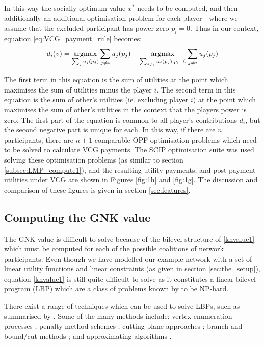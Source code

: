 In this way the socially optimum value $x^*$ needs to be computed, and then additionally an additional optimisation problem for each player - where we assume that the excluded participant has power zero $p_i=0$. Thus in our context, equation \ref{eq:VCG_payment_rule} becomes:
\begin{equation*} d_i(v)=\operatorname*{\arg\!\max}_{\sum_{j} u_j(p_j)}\sum_{j\ne i}u_j(p_j) - \operatorname*{\arg\!\max}_{\sum_{j\ne i} u_j(p_j), p_i=0}\sum_{j\ne i}u_j(p_j)\end{equation*}

The first term in this equation is the sum of utilities at the point which maximises the sum of utilities minus the player $i$.
The second term in this equation is the sum of other's utilities (ie. excluding player $i$) at the point which maximises the sum of other's utilities in the context that the players power is zero.
The first part of the equation is common to all player's contributions $d_i$, but the second negative part is unique for each.
In this way, if there are $n$ participants, there are $n+1$ comparable OPF optimisation problems which need to be solved to calculate VCG payments.
The SCIP optimisation suite was used solving these optimisation problems (as similar to section \ref{subsec:LMP_compute1}), and the resulting utility payments, and post-payment utilities under VCG are shown in Figures \ref{fig:1h} and \ref{fig:1g}.
The discussion and comparison of these figures is given in section \ref{sec:features}.


\subsection{Computing the GNK value}\label{subsec:gnk_compute1}

The GNK value is difficult to solve because of the bilevel structure of \eqref{knvalue1} which must be computed for each of the possible coalitions of network participants.
Even though we have modelled our example network with a set of linear utility functions and linear constraints (as given in section \ref{sec:the_setup}), equation \eqref{knvalue1} is still quite difficult to solve as it constitutes a linear bilevel program (LBP) which are a class of problems known by \cite{DBLP:journals/tec/SinhaMD18,Ben-Ayed:1990:CDB} to be NP-hard.

There exist a range of techniques which can be used to solve LBPs, such as summarised by \cite{DBLP:journals/tec/SinhaMD18,S.Dempe.Optimisations}.
Some of the many methods include: vertex enumeration processes \citep{Bialas:1984:TLP:2784019.2784026,Shi:2005:EKA:2641854.2642183,LIU1995644}; penalty method schemes \citep{KleinertSchmidt2019,ONAL1993126,dempe_optimisation111};
cutting plane approaches \citep{cuttingplane1};
branch-and-bound/cut methods \citep{SHI200551,Hansen:1992:NBR:141164.141181,Audet2007};
and approximating algorithms \citep{Pineda2018,rnnlbp1,genetic_algirthm_blp}.

